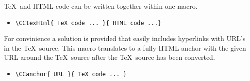 \documentclass[12pt]{article}
\begin{document}
\TeX\ and HTML code can be written together within one macro.

\begin{itemize}
    \item
        \verb+\CCtexHtml{ TeX code ... }{ HTML code ...}+
\end{itemize}

For convinience a solution is provided that easily includes
hyperlinks with URL's in the \TeX\ source. This macro translates to a
fully HTML anchor with the given URL around the \TeX\ source after the
\TeX\ source has been converted.

\begin{itemize}
    \item
        \verb+\CCanchor{ URL }{ TeX code ... }+
\end{itemize}
\end{document}
